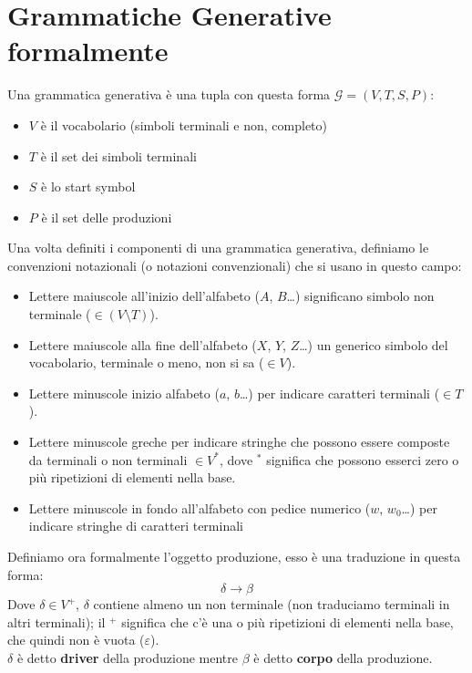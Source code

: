 \documentclass[class=book, crop=false, oneside, 12pt]{standalone}
\begin{document}
\section{Grammatiche Generative formalmente}
Una grammatica generativa è una tupla con questa forma \(\mathcal{G}=(V, T, S, P)\):
\begin{itemize}
    \item \(V\) è il vocabolario (simboli terminali e non, completo)
    \item \(T\) è il set dei simboli terminali
    \item \(S\) è lo start symbol
    \item \(P\) è il set delle produzioni
\end{itemize}
Una volta definiti i componenti di una grammatica generativa, definiamo le convenzioni notazionali (o notazioni convenzionali) che si usano in questo campo:
\begin{itemize}
    \item Lettere maiuscole all’inizio dell’alfabeto (\(A\), \(B\)…) significano simbolo non terminale (\(\in (V \setminus T)\)).
    \item Lettere maiuscole alla fine dell’alfabeto (\(X\), \(Y\), \(Z\)…) un generico simbolo del vocabolario, terminale o meno, non si sa (\(\in V\)).
    \item Lettere minuscole inizio alfabeto (\(a\), \(b\)…) per indicare caratteri terminali (\(\in T\)).
    \item Lettere minuscole greche per indicare stringhe che possono essere composte da terminali o non terminali \(\in V^*\), dove \(^*\) significa che possono esserci zero o più ripetizioni di elementi nella base.
    \item Lettere minuscole in fondo all’alfabeto con pedice numerico (\(w\), \(w_0\)…) per indicare stringhe di caratteri terminali
\end{itemize}
Definiamo ora formalmente l'oggetto produzione, esso è una traduzione in questa forma:
\begin{equation}
    \delta \to \beta
\end{equation}
Dove \(\delta \in V^+\), \(\delta\) contiene almeno un non terminale (non traduciamo terminali in altri terminali); il \(^+\) significa che c’è una o più ripetizioni di elementi nella base, che quindi non è vuota (\(\varepsilon\)).\\
\(\delta\) è detto \textbf{driver} della produzione mentre \(\beta\) è detto \textbf{corpo} della produzione.
\end{document}
